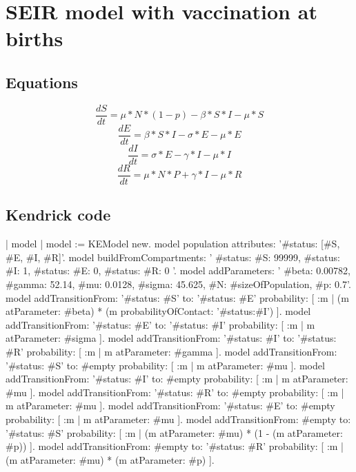 \documentclass[a4paper,10pt,twoside]{book}
\begin{document}
\section{ SEIR model with vaccination at births}\subsection{ Equations}

  \begin{equation}
    \frac{dS}{dt} = \mu*N*(1-p) - \beta*S*I - \mu*S
  \end{equation}
  \begin{equation}
    \frac{dE}{dt} = \beta*S*I - \sigma*E - \mu*E
  \end{equation}
  \begin{equation}
    \frac{dI}{dt} = \sigma*E - \gamma*I - \mu*I
  \end{equation}
  \begin{equation}
    \frac{dR}{dt} = \mu*N*P + \gamma*I - \mu*R
  \end{equation}
  
\subsection{ Kendrick code}

\begin{code}{}
| model |
	model := KEModel new.
	model population attributes: '{#status: [#S, #E, #I, #R]}'.
	model
		buildFromCompartments:
			'{
		{#status: #S}: 99999,
		{#status: #I}: 1,
		{#status: #E}: 0,
		{#status: #R}: 0
	}'.
	model addParameters: '{
		#beta: 0.00782,
		#gamma: 52.14,
		#mu: 0.0128,
		#sigma: 45.625,
		#N: #sizeOfPopulation,
		#p: 0.7}'.
	model
		addTransitionFrom: '{#status: #S}'
		to: '{#status: #E}'
		probability: [ :m | (m atParameter: #beta) * (m probabilityOfContact: '{#status:#I}') ].
	model
		addTransitionFrom: '{#status: #E}'
		to: '{#status: #I}'
		probability: [ :m | m atParameter: #sigma ].
	model
		addTransitionFrom: '{#status: #I}'
		to: '{#status: #R}'
		probability: [ :m | m atParameter: #gamma ].
	model
		addTransitionFrom: '{#status: #S}'
		to: #empty
		probability: [ :m | m atParameter: #mu ].
	model
		addTransitionFrom: '{#status: #I}'
		to: #empty
		probability: [ :m | m atParameter: #mu ].
	model
		addTransitionFrom: '{#status: #R}'
		to: #empty
		probability: [ :m | m atParameter: #mu ].
	model
		addTransitionFrom: '{#status: #E}'
		to: #empty
		probability: [ :m | m atParameter: #mu ].
	model
		addTransitionFrom: #empty
		to: '{#status: #S}'
		probability: [ :m | (m atParameter: #mu) * (1 - (m atParameter: #p)) ].
	model
		addTransitionFrom: #empty
		to: '{#status: #R}'
		probability: [ :m | (m atParameter: #mu) * (m atParameter: #p) ].
\end{code}
\end{document}
